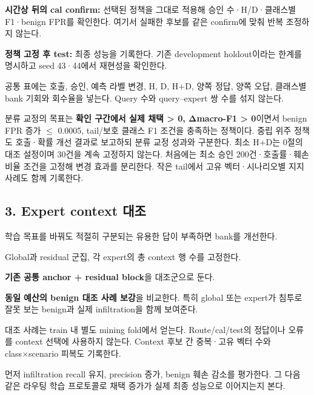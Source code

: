 \par\noindent \textbullet\enspace \textbf{시간상 뒤의 cal confirm:} 선택된 정책을 그대로 적용해 승인 수·H/\allowbreak{}D·클래스별 F1·benign FPR를 확인한다. 여기서 실패한 후보를 같은 confirm에 맞춰 반복 조정하지 않는다.


\par\noindent \textbullet\enspace \textbf{정책 고정 후 test:} 최종 성능을 기록한다. 기존 development holdout이라는 한계를 명시하고 seed 43·44에서 재현성을 확인한다.


공통 표에는 호출, 승인, 예측 라벨 변경, H, D, H+\allowbreak{}D, 양쪽 정답, 양쪽 오답, 클래스별 bank 기회와 회수율을 넣는다. Query 수와 query–expert 쌍 수를 섞지 않는다.

분류 교정의 목표는 \textbf{확인 구간에서 실제 채택 > 0, Δmacro-F1 > 0}이면서 benign FPR 증가 \ensuremath{\leq} 0.0005, tail/\allowbreak{}보호 클래스 F1 조건을 충족하는 정책이다. 중립 위주 정책도 호출·확률 개선 결과로 보고하되 분류 교정 성과와 구분한다. 최소 H+\allowbreak{}D는 0절의 대조 설정이며 30건을 계속 고정하지 않는다. 처음에는 최소 승인 200건·호출률·훼손 비율 조건을 고정해 변경 효과를 분리한다. 작은 tail에서 고유 벡터·시나리오별 지지 사례도 함께 기록한다.

\subsection{3. Expert context 대조}
학습 목표를 바꿔도 적절히 구분되는 유용한 답이 부족하면 bank를 개선한다.

\par\noindent \textbullet\enspace Global과 residual 군집, 각 expert의 총 context 행 수를 고정한다.


\par\noindent \textbullet\enspace \textbf{기존 공통 anchor +\allowbreak{} residual block}을 대조군으로 둔다.


\par\noindent \textbullet\enspace \textbf{동일 예산의 benign 대조 사례 보강}을 비교한다. 특히 global 또는 expert가 침투로 잘못 보는 benign과 실제 infiltration을 함께 보여준다.


\par\noindent \textbullet\enspace 대조 사례는 train 내 별도 mining fold에서 얻는다. Route/\allowbreak{}cal/\allowbreak{}test의 정답이나 오류를 context 선택에 사용하지 않는다. Context 후보 간 중복·고유 벡터 수와 class×scenario 피복도 기록한다.


\par\noindent \textbullet\enspace 먼저 infiltration recall 유지, precision 증가, benign 훼손 감소를 평가한다. 그 다음 같은 라우팅 학습 프로토콜로 채택 증가가 실제 최종 성능으로 이어지는지 본다.


